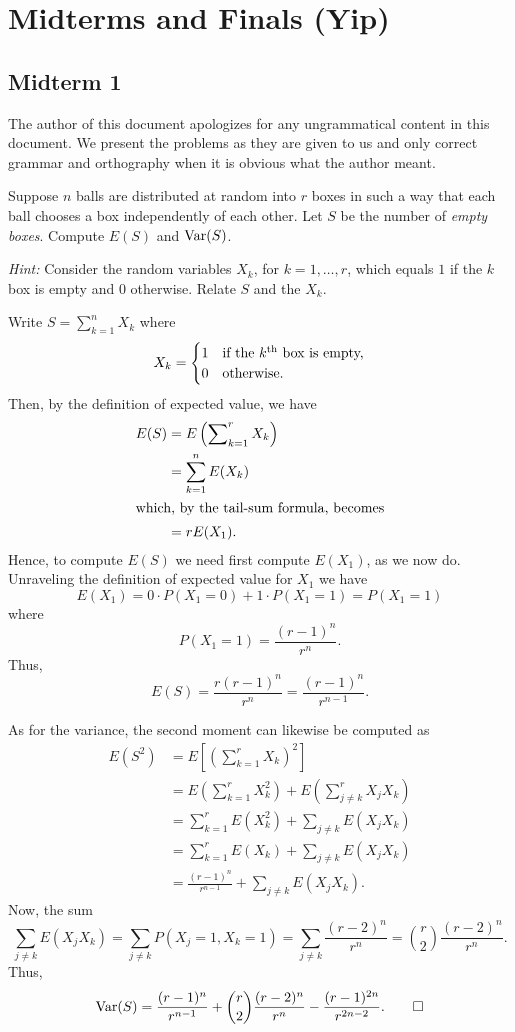 \section{Midterms and Finals (Yip)}
\subsection{Midterm 1}
The author of this document apologizes for any ungrammatical content in
this document. We present the problems as they are given to us and only
correct grammar and orthography when it is obvious what the author meant.
\begin{problem}
  Suppose \(n\) balls are distributed at random into \(r\) boxes in such a
  way that each ball chooses a box independently of each other. Let \(S\)
  be the number of \emph{empty boxes}. Compute \(E(S)\) and \(\operatorname{Var}(S)\).

  \noindent\emph{Hint:} Consider the random variables \(X_k\), for
  \(k=1,\dotsc,r\), which equals \(1\) if the \(k\) box is
  empty and \(0\) otherwise. Relate \(S\) and the \(X_k\).
\end{problem}
\begin{solution*}
  Write \(S=\sum_{k=1}^n X_k\) where
  \[
    X_k
    =
    \begin{cases}
      1&\text{if the \(k\)\textsuperscript{th} box is empty,}\\
      0&\text{otherwise.}
    \end{cases}
  \]
  Then, by the definition of expected value, we have
  \begin{align*}
    E(S)
    &=E\left(\sum\nolimits_{k=1}^r X_k\right)\\
    &=\sum_{k=1}^n E(X_k)\\
    \shortintertext{which, by the tail-sum formula, becomes}
    &=rE(X_1).
  \end{align*}
  Hence, to compute \(E(S)\) we need first compute \(E(X_1)\), as we now
  do. Unraveling the definition of expected value for \(X_1\) we have
  \[
    E(X_1)=0\cdot P(X_1=0)+1\cdot P(X_1=1)=P(X_1=1)
  \]
  where
  \[
    P(X_1=1)=\frac{(r-1)^n}{r^n}.
  \]
  Thus,
  \[
    E(S)=\frac{r(r-1)^n}{r^n}=\frac{(r-1)^n}{r^{n-1}}.
  \]

  As for the variance, the second moment can likewise be computed as
  \begin{align*}
    E(S^2)
    &=E\left[\left(\sum\nolimits_{k=1}^r X_k\right)^2\right]\\
    &=E\left(\sum\nolimits_{k=1}^r X_k^2\right)
      +E\left(\sum\nolimits_{j\neq k}^r X_jX_k\right)\\
    &=\sum_{k=1}^r E(X_k^2)+\sum_{j\neq k} E(X_jX_k)\\
    &=\sum_{k=1}^r E(X_k)+\sum_{j\neq k}E(X_jX_k)\\
    &=\frac{(r-1)^n}{r^{n-1}}+\sum_{j\neq k}E(X_jX_k).
  \end{align*}
  Now, the sum
  \[
    \sum_{j\neq k}E(X_jX_k)=%
    \sum_{j\neq k}P(X_j=1,X_k=1)=%
    \sum_{j\neq k}\frac{(r-2)^n}{r^n}=%
    \binom{r}{2}\frac{(r-2)^n}{r^n}.
  \]
  Thus,
  \[
    \Var(S)=%
    \frac{(r-1)^n}{r^{n-1}}+%
    \binom{r}{2}\frac{(r-2)^n}{r^n}-%
    \frac{(r-1)^{2n}}{r^{2n-2}}.\qedhere
  \]
\end{solution*}

